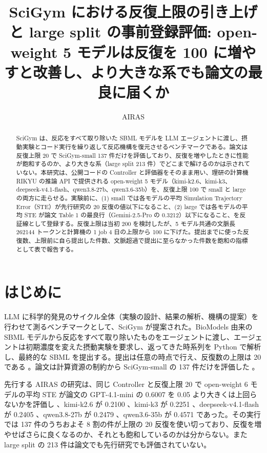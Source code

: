 \documentclass{article}
\title{SciGym における反復上限の引き上げと large split の事前登録評価: open-weight 5 モデルは反復を 100 に増やすと改善し、より大きな系でも論文の最良に届くか}
\author{AIRAS}
\providecommand{\unverified}[1]{#1}
\begin{document}
\maketitle

\begin{abstract}
SciGym \citep{duan-2025-measuring} は、反応をすべて取り除いた SBML モデルを LLM エージェントに渡し、摂動実験とコード実行を繰り返して反応機構を復元させるベンチマークである。論文は反復上限 20 で SciGym-small 137 件だけを評価しており、反復を増やしたときに性能が飽和するのか、より大きな系（large split 213 件）でどこまで解けるのかは示されていない。本研究は、公開コードの Controller と評価器をそのまま用い、理研の計算機 RIKYU の推論 API で提供される open-weight 5 モデル（kimi-k2.6、kimi-k3、deepseek-v4.1-flash、qwen3.8-27b、qwen3.6-35b）を、反復上限 100 で small と large の両方に走らせる。実験前に、(1) small では各モデルの平均 Simulation Trajectory Error（STE）が先行研究の 20 反復の値以下になること、(2) large では各モデルの平均 STE が論文 Table 1 の最良行（Gemini-2.5-Pro の 0.3212）以下になること、を反証線として登録する。反復上限は当初 200 を検討したが、5 モデル共通の文脈長 262144 トークンと計算機の 1 job 4 日の上限から 100 に下げた。提出までに使った反復数、上限前に自ら提出した件数、文脈超過で提出に至らなかった件数を飽和の指標として表で報告する。
\end{abstract}

\section{はじめに}
\label{sec:intro}
LLM に科学的発見のサイクル全体（実験の設計、結果の解析、機構の提案）を行わせて測るベンチマークとして、SciGym \citep{duan-2025-measuring} が提案された。BioModels 由来の SBML モデルから反応をすべて取り除いたものをエージェントに渡し、エージェントは初期濃度を変えた摂動実験を要求し、返ってきた時系列を Python で解析し、最終的な SBML を提出する。提出は任意の時点で行え、反復数の上限は 20 である \cite[s1.p3]{duan-2025-measuring}。論文は計算資源の制約から SciGym-small の 137 件だけを評価した \cite[s1.p2]{duan-2025-measuring}。

先行する AIRAS の研究は、同じ Controller と反復上限 20 で open-weight 6 モデルの平均 STE が論文の GPT-4.1-mini の 0.6007 を 0.05 より大きくは上回らないかを評価し \cite[s3.p1]{scigymrikyuopenmodels-2026-scigym}、kimi-k2.6 が \unverified{0.2100} \cite[s3.p2]{scigymrikyuopenmodels-2026-scigym}、kimi-k3 が \unverified{0.2251} \cite[s3.p3]{scigymrikyuopenmodels-2026-scigym}、deepseek-v4.1-flash が \unverified{0.2405} \cite[s3.p4]{scigymrikyuopenmodels-2026-scigym}、qwen3.8-27b が \unverified{0.2479} \cite[s3.p5]{scigymrikyuopenmodels-2026-scigym}、qwen3.6-35b が \unverified{0.4571} \cite[s3.p6]{scigymrikyuopenmodels-2026-scigym} であった。その実行では 137 件のうちおよそ 8 割の件が上限の 20 反復を使い切っており、反復を増やせばさらに良くなるのか、それとも飽和しているのかは分からない。また large split の 213 件は論文でも先行研究でも評価されていない。
\end{document}
